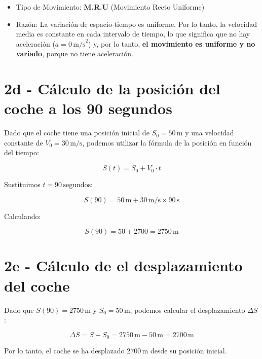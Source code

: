 \documentclass{article}
\begin{document}
\begin{itemize}
    \item Tipo de Movimiento: \textbf{M.R.U} (Movimiento Recto Uniforme)
    \item Razón: La variación de espacio-tiempo es uniforme. Por lo tanto, la velocidad media es constante en cada intervalo de tiempo, lo que significa que no hay aceleración (\(a = 0 \, \text{m/s}^2\)) y, por lo tanto, \textbf{el movimiento es uniforme y no variado}, porque no tiene aceleración. 
\end{itemize}


\section*{2d - Cálculo de la posición del coche a los 90 segundos}

Dado que el coche tiene una posición inicial de \(S_0 = 50 \, \text{m}\) y una velocidad constante de \(V_0 = 30 \, \text{m/s}\), podemos utilizar la fórmula de la posición en función del tiempo:

\[
S(t) = S_0 + V_0 \cdot t
\]

Sustituimos \(t = 90 \, \text{segundos}\):

\[
S(90) = 50 \, \text{m} + 30 \, \text{m/s} \times 90 \, \text{s}
\]

Calculando:

\[
S(90) = 50 + 2700 = \boxed{2750 \, \text{m}}
\]


\section*{2e - Cálculo de el desplazamiento del coche}

Dado que \( S(90) = 2750 \, \text{m} \) y \( S_0 = 50 \, \text{m} \), podemos calcular el desplazamiento \(\Delta S\):

\[
\Delta S = S - S_0 = 2750 \, \text{m} - 50 \, \text{m} = \boxed{2700 \, \text{m}}
\]

\justify
Por lo tanto, el coche se ha desplazado \( 2700 \, \text{m} \) desde su posición inicial.
\end{document}
